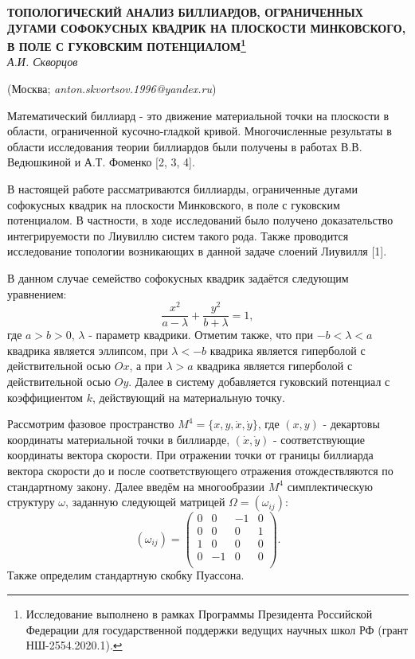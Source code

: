 \begin{center}
    {\bf ТОПОЛОГИЧЕСКИЙ АНАЛИЗ БИЛЛИАРДОВ, ОГРАНИЧЕННЫХ ДУГАМИ СОФОКУСНЫХ КВАДРИК НА ПЛОСКОСТИ МИНКОВСКОГО, В ПОЛЕ С ГУКОВСКИМ ПОТЕНЦИАЛОМ\footnote{Исследование выполнено в рамках Программы Президента Российской Федерации для государственной поддержки ведущих научных школ РФ (грант НШ-2554.2020.1).}}\\

    {\it А.И. Скворцов}

    (Москва; {\it anton.skvortsov.1996@yandex.ru})
\end{center}


Математический биллиард - это движение материальной точки на плоскости в области, ограниченной кусочно-гладкой кривой. Многочисленные результаты в области исследования теории биллиардов были получены в работах В.В. Ведюшкиной и А.Т. Фоменко [2, 3, 4].

В настоящей работе рассматриваются биллиарды, ограниченные дугами софокусных квадрик на плоскости Минковского, в поле с гуковским потенциалом. В частности, в ходе исследований было получено доказательство интегрируемости по Лиувиллю систем такого рода. Также проводится исследование топологии возникающих в данной задаче слоений Лиувилля [1].

В данном случае семейство софокусных квадрик задаётся следующим уравнением:
$$\frac{x^2}{a-\lambda}+\frac{y^2}{b+\lambda}=1,$$
где $a>b>0$, $\lambda$ - параметр квадрики. Отметим также, что при $-b<\lambda<a$ квадрика является эллипсом, при $\lambda<-b$ квадрика является гиперболой с действительной осью $Ox$, а при $\lambda>a$ квадрика является гиперболой с действительной осью $Oy$. Далее в систему добавляется гуковский потенциал с коэффициентом $k$, действующий на материальную точку.

Рассмотрим фазовое пространство $M^4=\{x, y, \dot{x}, \dot{y}\}$, где $(x, y)$ - декартовы координаты материальной точки в биллиарде, $(\dot{x}, \dot{y})$ - соответствующие координаты вектора скорости. При отражении точки от границы биллиарда вектора скорости до и после соответствующего отражения отождествляются по стандартному закону. Далее введём на многообразии $M^4$ симплектическую структуру $\omega$, заданную следующей матрицей $\Omega=(\omega_{ij})$:
$$(\omega_{ij})=\left(\begin{array}{cccc}
0 & 0 & -1 & 0 \\
0 & 0 & 0 & 1 \\
1 & 0 & 0 & 0 \\
0 & -1 & 0 & 0 \\
\end{array}\right)
.$$
Также определим стандартную скобку Пуассона.


